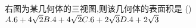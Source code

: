 \documentclass[class=ctexart,crop=false]{standalone}
\begin{document}
右图为某几何体的三视图,则该几何体的表面积是 \hfill (\qquad)\\
$A. 6+4\sqrt{2}\hfill B. 4+4\sqrt{2}\hfill 
C. 6+2\sqrt{3}\hfill D. 4+2\sqrt{3}\hfill$
\end{document}
